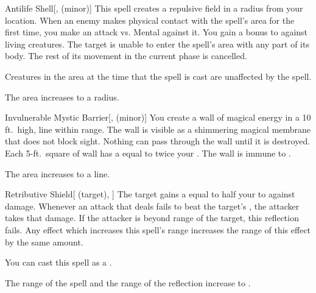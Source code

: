 \lowercase{\hypertarget{spell:Antilife Shell}{}}\label{spell:Antilife Shell}
\begin{freeability}[Rank 6]{\hypertarget{spell:Antilife Shell}{Antilife Shell}}[,  (minor)]
This spell creates a repulsive field in a \areamed radius  from your location.
When an enemy makes physical contact with the spell's area for the first time, you make an attack vs. Mental against it.
You gain a  bonus to  against living creatures.
\hit The target is unable to enter the spell's area with any part of its body.
The rest of its movement in the current phase is cancelled.

Creatures in the area at the time that the spell is cast are unaffected by the spell.

\rankline
{} The area increases to a \arealarge radius.
\end{freeability}
\vspace{0.25em}



\lowercase{\hypertarget{spell:Invulnerable Mystic Barrier}{}}\label{spell:Invulnerable Mystic Barrier}
\begin{freeability}[Rank 6]{\hypertarget{spell:Invulnerable Mystic Barrier}{Invulnerable Mystic Barrier}}[,  (minor)]
\targetrule
You create a wall of magical energy in a 10 ft.\ high, \areamed line within \rngmed range.
The wall is visible as a shimmering magical membrane that does not block sight.
Nothing can pass through the wall until it is destroyed.
Each 5-ft.\ square of wall has a  equal to twice your .
The wall is immune to .

\rankline
{} The area increases to a \arealarge line.
\end{freeability}
\vspace{0.25em}



\lowercase{\hypertarget{spell:Retributive Shield}{}}\label{spell:Retributive Shield}
\begin{attuneability}[Rank 6]{\hypertarget{spell:Retributive Shield}{Retributive Shield}}[ (target), ]
The target gains a  equal to half your  to  against  damage.
Whenever an attack that deals  fails to beat the target's , the attacker takes that damage.
If the attacker is beyond \rngclose range of the target, this reflection fails.
Any effect which increases this spell's range increases the range of this effect by the same amount.

You can cast this spell as a .

\rankline
{} The range of the spell and the range of the reflection increase to \rngmed.
\end{attuneability}
\vspace{0.25em}



